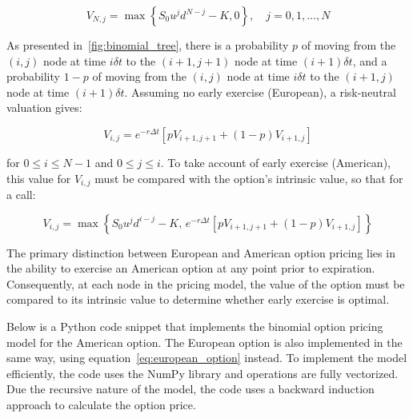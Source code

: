     \begin{equation}
        V_{N,j} = \max
            \left\lbrace
                S_0 u^j d^{N-j} - K, 0
            \right\rbrace, \quad j = 0, 1, \ldots, N
        \label{eq:call_option}
    \end{equation}

    As presented in~\ref{fig:binomial_tree},
    there is a probability $p$ of moving from the $(i, j)$ node at time $i \delta t$ to the $(i+1, j+1)$
    node at time $(i+1) \delta t$, and a probability $1 - p$ of moving from the $(i, j)$ node at
    time $i \delta t$ to the $(i+1, j)$ node at time $(i+1) \delta t$.
    Assuming no early exercise (European), a risk-neutral valuation gives:

    \begin{equation}
        V_{i,j} = e^{-r \Delta t} \left[ p V_{i+1, j+1} + (1 - p) V_{i+1, j} \right]
        \label{eq:european_option}
    \end{equation}

    for $0 \leq i \leq N-1$ and $0 \leq j \leq i$.
    To take account of early exercise (American),
    this value for $V_{i,j}$ must be compared with the option's intrinsic value, so that for a call:

    \begin{equation}
        V_{i,j} = \max
            \left\lbrace
                S_0 u^j d^{i-j} - K, \, e^{-r \Delta t} \left[ p V_{i+1, j+1} + (1 - p) V_{i+1, j} \right]
            \right\rbrace
        \label{eq:american_call_option}
    \end{equation}

    The primary distinction between European and American option pricing lies in the ability to exercise
    an American option at any point prior to expiration.
    Consequently, at each node in the pricing model,
    the value of the option must be compared to its intrinsic value to determine whether early exercise is optimal.

    Below is a Python code snippet that implements the binomial option pricing model for the American option.
    The European option is also implemented in the same way, using equation~\ref{eq:european_option} instead.
    To implement the model efficiently, the code uses the NumPy library and operations are fully vectorized.
    Due the recursive nature of the model, the code uses a backward induction approach to calculate the option price.

